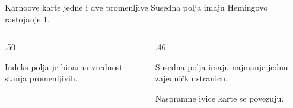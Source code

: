 \begin{frame}[label=02-s034]{Karnoove karte jedne i dve promenljive}
\setlength{\parskip}{0pt}
\alert{Susedna polja imaju Hemingovo rastojanje 1.}
\par\vspace{3mm}
\begin{columns}[T,onlytextwidth]
\begin{column}{.50\textwidth}\centering
\vspace{2mm}

\par\vspace{2mm}
\raggedright
Indeks polja je binarna vrednost stanja promenljivih.
\end{column}
\begin{column}{.46\textwidth}\centering
{}\vspace{2mm}

\par\vspace{2mm}
\raggedright
\alert{Susedna polja imaju najmanje jednu zajedničku stranicu.}
\par\vspace{2mm}
Naspramne ivice karte se povezuju.
\end{column}
\end{columns}
\end{frame}
